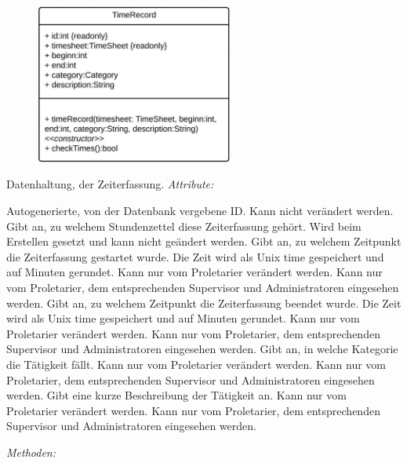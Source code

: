 \begin{itemize}
                \begin{figure}[htb]
                \centering
                \includegraphics[width=6.5cm]{Diagramms/class/singleclass/TimeRecord.pdf}
                \end{figure}
                \newline
                Datenhaltung, der Zeiterfassung.
                \emph{Attribute:}
                \begin{itemize}
                        Autogenerierte, von der Datenbank vergebene ID.
                        Kann nicht verändert werden.
                        Gibt an, zu welchem Stundenzettel diese Zeiterfassung gehört.
                        Wird beim Erstellen gesetzt und kann nicht geändert werden.
                        Gibt an, zu welchem Zeitpunkt die Zeiterfassung gestartet wurde.
                        Die Zeit wird als Unix time gespeichert und auf Minuten gerundet.
                        Kann nur vom Proletarier verändert werden.
                        Kann nur vom Proletarier, dem entsprechenden Supervisor und Administratoren eingesehen werden.
                        Gibt an, zu welchem Zeitpunkt die Zeiterfassung beendet wurde.
                        Die Zeit wird als Unix time gespeichert und auf Minuten gerundet.
                        Kann nur vom Proletarier verändert werden.
                        Kann nur vom Proletarier, dem entsprechenden Supervisor und Administratoren eingesehen werden.
                        Gibt an, in welche Kategorie die Tätigkeit fällt.
                        Kann nur vom Proletarier verändert werden.
                        Kann nur vom Proletarier, dem entsprechenden Supervisor und Administratoren eingesehen werden.
                        Gibt eine kurze Beschreibung der Tätigkeit an.
                        Kann nur vom Proletarier verändert werden.
                        Kann nur vom Proletarier, dem entsprechenden Supervisor und Administratoren eingesehen werden.
                \end{itemize}
                \emph{Methoden:}
                \begin{itemize}
                \end{itemize}


\end{itemize}
